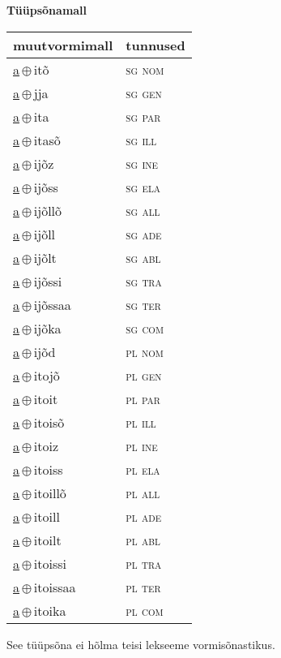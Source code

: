 

\vspace{3.5em}
\noindent \begin{minipage}{\textwidth}
\noindent \textbf{Tüüpsõnamall \,}\\

\begin{sideways}
\begin{tabular}{l l}
muutvormimall & tunnused \\
\hline
\underline{a}\,$\oplus$\,itõ & \textsc{ sg nom } \\
\underline{a}\,$\oplus$\,jja & \textsc{ sg gen } \\
\underline{a}\,$\oplus$\,ita & \textsc{ sg par } \\
\underline{a}\,$\oplus$\,itasõ & \textsc{ sg ill } \\
\underline{a}\,$\oplus$\,ijõz & \textsc{ sg ine } \\
\underline{a}\,$\oplus$\,ijõss & \textsc{ sg ela } \\
\underline{a}\,$\oplus$\,ijõllõ & \textsc{ sg all } \\
\underline{a}\,$\oplus$\,ijõll & \textsc{ sg ade } \\
\underline{a}\,$\oplus$\,ijõlt & \textsc{ sg abl } \\
\underline{a}\,$\oplus$\,ijõssi & \textsc{ sg tra } \\
\underline{a}\,$\oplus$\,ijõssaa & \textsc{ sg ter } \\
\underline{a}\,$\oplus$\,ijõka & \textsc{ sg com } \\
\underline{a}\,$\oplus$\,ijõd & \textsc{ pl nom } \\
\underline{a}\,$\oplus$\,itojõ & \textsc{ pl gen } \\
\underline{a}\,$\oplus$\,itoit & \textsc{ pl par } \\
\underline{a}\,$\oplus$\,itoisõ & \textsc{ pl ill } \\
\underline{a}\,$\oplus$\,itoiz & \textsc{ pl ine } \\
\underline{a}\,$\oplus$\,itoiss & \textsc{ pl ela } \\
\underline{a}\,$\oplus$\,itoillõ & \textsc{ pl all } \\
\underline{a}\,$\oplus$\,itoill & \textsc{ pl ade } \\
\underline{a}\,$\oplus$\,itoilt & \textsc{ pl abl } \\
\underline{a}\,$\oplus$\,itoissi & \textsc{ pl tra } \\
\underline{a}\,$\oplus$\,itoissaa & \textsc{ pl ter } \\
\underline{a}\,$\oplus$\,itoika & \textsc{ pl com } \\
\end{tabular}
\end{sideways}
\label{tab:tüüpsõnamall-aitõ}

\end{minipage}

 
\vspace{1em}
\noindent See tüüpsõna ei hõlma teisi lekseeme vormi\-sõnastikus.
